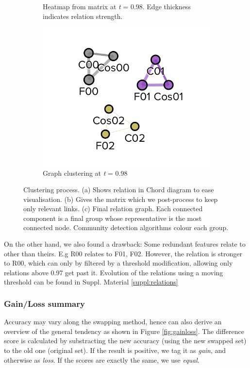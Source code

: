 \begin{figure}[!h]
\begin{subfigure}[b]{0.3\linewidth}
		\caption{Heatmap from matrix at \emph{t} = 0.98. Edge thickness indicates relation strength.}
	\end{subfigure}
	\hfill
	\begin{subfigure}[b]{0.3\linewidth}
		\includegraphics[width=\linewidth]{Major Thesis/figures/graphs/graph-toy.png}
		\caption{Graph clustering at \emph{t} = 0.98}
	\end{subfigure}
	\label{fig:triade}
	\caption{Clustering process. (a) Shows relation in Chord diagram to ease visualisation. (b) Gives the matrix which we post-process to keep only relevant links. (c) Final relation graph. Each connected component is a final group whose representative is the most connected node. Community detection algorithms colour each group.}
\end{figure}

On the other hand, we also found a drawback: Some redundant features relate to other than theirs. E.g R00 relates to F01, F02. However, the relation is stronger to R00, which can only by filtered by a threshold modification, allowing only relations above 0.97 get past it. Evolution of the relations using a moving threshold can be found in Suppl. Material \ref{suppl:relations}

\subsubsection{Gain/Loss summary}
Accuracy may vary along the swapping method, hence can also derive an overview of the general tendency as shown in Figure \ref{fig:gainloss}. The difference score is calculated by substracting the new accuracy (using the new swapped set) to the old one (original set). If the result is positive, we tag it as \emph{gain}, and otherwise as \emph{loss}. If the scores are exactly the same, we use \emph{equal}.

